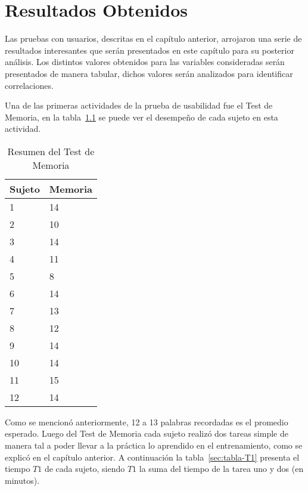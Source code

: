\chapter{Resultados Obtenidos}
\label{sec:resultados}


Las pruebas con usuarios, descritas en el cap\'itulo anterior, arrojaron una serie de
resultados interesantes que ser\'an presentados en este cap\'itulo para su posterior an\'alisis. Los
distintos valores obtenidos para las variables consideradas ser\'an presentados de manera tabular, dichos
valores ser\'an analizados para identificar correlaciones.

Una de las primeras actividades de la prueba de usabilidad fue el Test de Memoria, en la tabla~\ref{sec:tabla-memoria}
se puede ver el desempeño de cada sujeto en esta actividad.

\begin{table}[H]
\centering
\footnotesize
\begin{tabular}{|p{1.6cm}|p{1.6cm}|}
\hline
    Sujeto & Memoria \\
    \hline 
    1 & 14 \\
    2 & 10 \\
    3 & 14 \\
    4 & 11 \\
    5 & 8 \\
    6 & 14 \\
    7 & 13 \\
    8 & 12 \\
    9 & 14 \\
    10 & 14 \\
    11 & 15 \\
    12 & 14 \\
\hline
\end{tabular}
\caption{Resumen del Test de Memoria}
\label{sec:tabla-memoria}
\end{table}

Como se mencion\'o anteriormente, 12 a 13 palabras recordadas es el promedio esperado. Luego del Test de Memoria
cada sujeto realiz\'o dos tareas simple de manera tal a poder llevar a la pr\'actica lo aprendido en el entrenamiento,
como se explic\'o en el cap\'itulo anterior. A continuaci\'on la tabla~\ref{sec:tabla-T1} presenta el tiempo $T1$ de
cada sujeto, siendo $T1$ la suma del tiempo de la tarea uno y dos (en minutos).

